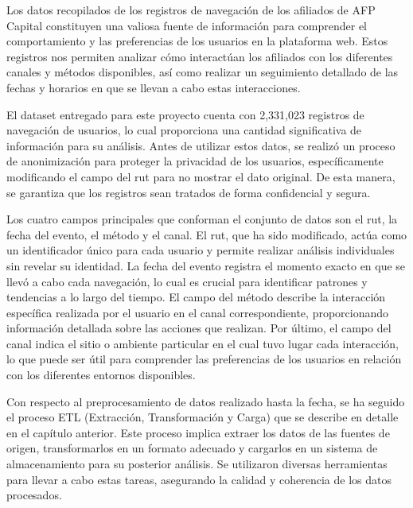 Los datos recopilados de los registros de navegación de los afiliados de AFP Capital constituyen una valiosa fuente de información para comprender el comportamiento y las preferencias de los usuarios en la plataforma web. Estos registros nos permiten analizar cómo interactúan los afiliados con los diferentes canales y métodos disponibles, así como realizar un seguimiento detallado de las fechas y horarios en que se llevan a cabo estas interacciones.

El dataset entregado para este proyecto cuenta con 2,331,023 registros de navegación de usuarios, lo cual proporciona una cantidad significativa de información para su análisis. Antes de utilizar estos datos, se realizó un proceso de anonimización para proteger la privacidad de los usuarios, específicamente modificando el campo del rut para no mostrar el dato original. De esta manera, se garantiza que los registros sean tratados de forma confidencial y segura.

Los cuatro campos principales que conforman el conjunto de datos son el rut, la fecha del evento, el método y el canal. El rut, que ha sido modificado, actúa como un identificador único para cada usuario y permite realizar análisis individuales sin revelar su identidad. La fecha del evento registra el momento exacto en que se llevó a cabo cada navegación, lo cual es crucial para identificar patrones y tendencias a lo largo del tiempo. El campo del método describe la interacción específica realizada por el usuario en el canal correspondiente, proporcionando información detallada sobre las acciones que realizan. Por último, el campo del canal indica el sitio o ambiente particular en el cual tuvo lugar cada interacción, lo que puede ser útil para comprender las preferencias de los usuarios en relación con los diferentes entornos disponibles.

Con respecto al preprocesamiento de datos realizado hasta la fecha, se ha seguido el proceso ETL (Extracción, Transformación y Carga) que se describe en detalle en el capítulo anterior. Este proceso implica extraer los datos de las fuentes de origen, transformarlos en un formato adecuado y cargarlos en un sistema de almacenamiento para su posterior análisis. Se utilizaron diversas herramientas para llevar a cabo estas tareas, asegurando la calidad y coherencia de los datos procesados.


